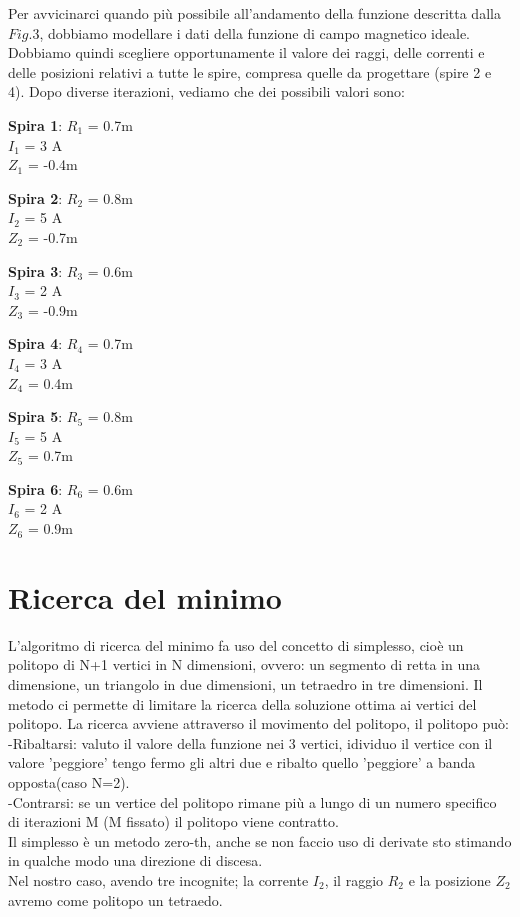 \documentclass[a4paper, 11pt]{article}
\begin{document}
Per avvicinarci quando più possibile all'andamento della funzione descritta
dalla $Fig.3$, dobbiamo modellare i dati della funzione di campo magnetico ideale.
Dobbiamo quindi scegliere opportunamente il valore dei raggi, delle correnti e
delle posizioni relativi a tutte le spire, compresa quelle da progettare (spire
2 e 4). 
Dopo diverse iterazioni, vediamo che dei possibili valori sono:
\newline  \\
\centerline{ \textbf{Spira 1}: $R_{1}$ = 0.7m  \\ $I_{1}$ = 3 A \\ $Z_{1}$ = -0.4m} 
\centerline{ \textbf{Spira 2}: $R_{2}$ = 0.8m  \\ $I_{2}$ = 5 A \\ $Z_{2}$ = -0.7m}
\centerline{ \textbf{Spira 3}: $R_{3}$ = 0.6m \\ $I_{3}$ = 2 A \\ $Z_{3}$ = -0.9m}
\centerline{ \textbf{Spira 4}: $R_{4}$ = 0.7m \\ $I_{4}$ = 3 A \\ $Z_{4}$ = 0.4m}
\centerline{ \textbf{Spira 5}: $R_{5}$ = 0.8m \\ $I_{5}$ = 5 A \\ $Z_{5}$ = 0.7m}
\centerline{ \textbf{Spira 6}: $R_{6}$ = 0.6m \\ $I_{6}$ = 2 A \\ $Z_{6}$ = 0.9m}

\section* {Ricerca del minimo}

L'algoritmo di ricerca del minimo fa uso del concetto di simplesso, cioè un politopo di N+1 vertici 
in N dimensioni, ovvero: un segmento di retta in una dimensione, un triangolo in due 
dimensioni, un tetraedro in tre dimensioni. Il metodo ci permette di limitare la
ricerca della soluzione ottima ai vertici del politopo. La ricerca avviene 
attraverso il movimento del politopo, il politopo può:\\   
-Ribaltarsi:    valuto il valore della funzione nei 3 vertici, idividuo il vertice
	con il valore 'peggiore' tengo fermo gli altri due e ribalto quello 
	'peggiore' a banda opposta(caso N=2). \\
-Contrarsi:     se un vertice del politopo rimane più a lungo di un numero 
	specifico di iterazioni M (M fissato) il politopo viene contratto.\\
Il simplesso è un metodo zero-th, anche se non faccio uso di derivate sto stimando in qualche
modo una direzione di discesa. \\
Nel nostro caso, avendo tre incognite; la corrente $I_{2}$, il raggio $R_{2}$ e
la posizione $Z_{2}$ avremo come politopo un tetraedo.



\begin{thebibliography}{9}
\end{thebibliography}
\end{document}
